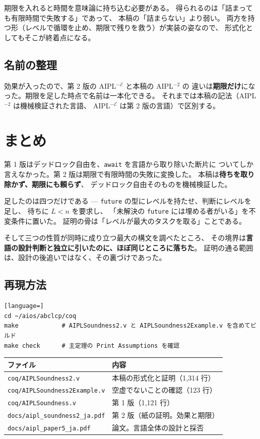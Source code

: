 \documentclass[11pt,a4paper]{ltjsarticle}
\theoremstyle{definition}
\theoremstyle{remark}
\begin{document}
期限を入れると時間を意味論に持ち込む必要がある。
得られるのは「詰まっても有限時間で失敗する」であって、
本稿の「詰まらない」より弱い。
両方を持つ形（レベルで循環を止め、期限で残りを救う）が実装の姿なので、
形式化としてもそこが終着点になる。

\subsection{名前の整理}

効果が入ったので、第 2 版の AIPL$^{-\mathcal{E}}$ と本稿の AIPL$^{-2}$ の
違いは\textbf{期限だけ}になった。期限を足した時点で名前は一本化できる。
それまでは本稿の記法（AIPL$^{-2}$ は機械検証された言語、
AIPL$^{-\mathcal{E}}$ は第 2 版の言語）で区別する。

\section{まとめ}

第 1 版はデッドロック自由を、\texttt{await} を言語から取り除いた断片に
ついてしか言えなかった。第 2 版は期限で有限時間の失敗に変換した。
本稿は\textbf{待ちを取り除かず、期限にも頼らず}、
デッドロック自由そのものを機械検証した。

足したのは四つだけである ---
\texttt{future} の型にレベルを持たせ、判断にレベルを足し、
待ちに $L < n$ を要求し、
「未解決の \texttt{future} には埋める者がいる」を不変条件に置いた。
証明の骨は「レベルが最大のタスクを取る」ことである。

そして三つの性質が同時に成り立つ最大の構文を調べたところ、
その境界は\textbf{言語の設計判断と独立に引いたのに、ほぼ同じところに落ちた}。
証明の通る範囲は、設計の後追いではなく、その裏づけであった。

\subsection*{再現方法}

\begin{lstlisting}[language=]
cd ~/aios/abclcp/coq
make            # AIPLSoundness2.v と AIPLSoundness2Example.v を含めてビルド
make check      # 主定理の Print Assumptions を確認
\end{lstlisting}

\begin{center}
\small
\begin{tabular}{@{}ll@{}}
\toprule
ファイル & 内容 \\
\midrule
\texttt{coq/AIPLSoundness2.v} & 本稿の形式化と証明（1{,}314 行） \\
\texttt{coq/AIPLSoundness2Example.v} & 空虚でないことの確認（123 行） \\
\texttt{coq/AIPLSoundness.v} & 第 1 版（1{,}121 行） \\
\texttt{docs/aipl\_soundness2\_ja.pdf} & 第 2 版（紙の証明。効果と期限） \\
\texttt{docs/aipl\_paper5\_ja.pdf} & 論文。言語全体の設計と採否 \\
\bottomrule
\end{tabular}
\end{center}
\end{document}
